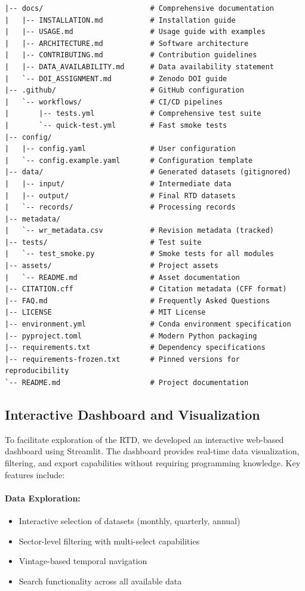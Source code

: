 \documentclass[a4paper, fleqn, 11pt]{article}
\begin{document}
\begin{lstlisting}[caption={Repository directory structure}]
|-- docs/                         # Comprehensive documentation
|   |-- INSTALLATION.md           # Installation guide
|   |-- USAGE.md                  # Usage guide with examples
|   |-- ARCHITECTURE.md           # Software architecture
|   |-- CONTRIBUTING.md           # Contribution guidelines
|   |-- DATA_AVAILABILITY.md      # Data availability statement
|   `-- DOI_ASSIGNMENT.md         # Zenodo DOI guide
|-- .github/                      # GitHub configuration
|   `-- workflows/                # CI/CD pipelines
|       |-- tests.yml             # Comprehensive test suite
|       `-- quick-test.yml        # Fast smoke tests
|-- config/
|   |-- config.yaml               # User configuration
|   `-- config.example.yaml       # Configuration template
|-- data/                         # Generated datasets (gitignored)
|   |-- input/                    # Intermediate data
|   |-- output/                   # Final RTD datasets
|   `-- records/                  # Processing records
|-- metadata/
|   `-- wr_metadata.csv           # Revision metadata (tracked)
|-- tests/                        # Test suite
|   `-- test_smoke.py             # Smoke tests for all modules
|-- assets/                       # Project assets
|   `-- README.md                 # Asset documentation
|-- CITATION.cff                  # Citation metadata (CFF format)
|-- FAQ.md                        # Frequently Asked Questions
|-- LICENSE                       # MIT License
|-- environment.yml               # Conda environment specification
|-- pyproject.toml                # Modern Python packaging
|-- requirements.txt              # Dependency specifications
|-- requirements-frozen.txt       # Pinned versions for reproducibility
`-- README.md                     # Project documentation
\end{lstlisting}

\subsection{Interactive Dashboard and Visualization}

To facilitate exploration of the RTD, we developed an interactive web-based dashboard using Streamlit. The dashboard provides real-time data visualization, filtering, and export capabilities without requiring programming knowledge. Key features include:

\paragraph{Data Exploration:}
\begin{itemize}
    \item Interactive selection of datasets (monthly, quarterly, annual)
    \item Sector-level filtering with multi-select capabilities
    \item Vintage-based temporal navigation
    \item Search functionality across all available data
\end{itemize}
\end{document}
